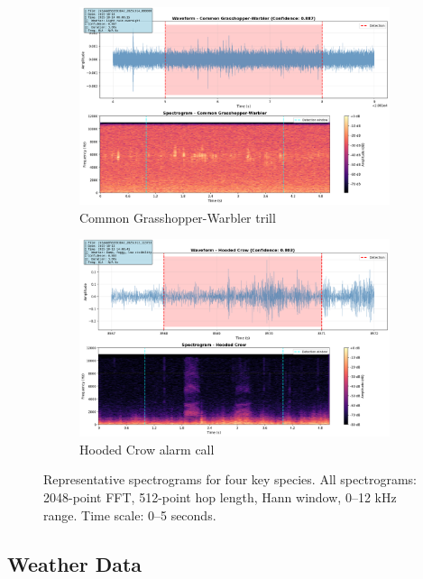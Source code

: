 \documentclass[twocolumn]{article}
\begin{document}
\begin{figure}[H]
\begin{subfigure}{0.45\textwidth}
\includegraphics[width=\textwidth]{figures/spectrogram_grasshopper.png}
\caption{Common Grasshopper-Warbler trill}
\end{subfigure}
\hfill
\begin{subfigure}{0.45\textwidth}
\includegraphics[width=\textwidth]{figures/spectrogram_crow.png}
\caption{Hooded Crow alarm call}
\end{subfigure}

\caption{Representative spectrograms for four key species. All spectrograms: 2048-point FFT, 512-point hop length, Hann window, 0--12 kHz range. Time scale: 0--5 seconds.}
\label{fig:spectrograms}
\end{figure}

\subsection{Weather Data}
\end{document}
